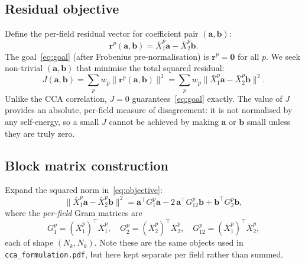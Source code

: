 \documentclass[a4paper,11pt]{article}
\newcommand{\va}{\bm{a}}
\newcommand{\vb}{\bm{b}}
\newcommand{\Xn}[2]{\bar{X}_{#1}^{#2}}
\newcommand{\Gb}[1]{G_{#1}}
\newcommand{\Nk}{N_k}
\theoremstyle{plain}
\begin{document}
\subsection{Residual objective}
\label{sec:residual}

Define the per-field residual vector for coefficient pair $(\va, \vb)$:
\begin{equation}
    \bm{r}^p(\va,\vb) = \Xn{1}{p}\va - \Xn{2}{p}\vb.
    \label{eq:residual}
\end{equation}
The goal~\eqref{eq:goal} (after Frobenius pre-normalisation) is $\bm{r}^p = \bm{0}$
for all $p$.
We seek non-trivial $(\va, \vb)$ that minimise the total squared residual:
\begin{equation}
    J(\va,\vb) = \sum_p w_p \lVert\bm{r}^p(\va,\vb)\rVert^2
               = \sum_p w_p \lVert\Xn{1}{p}\va - \Xn{2}{p}\vb\rVert^2.
    \label{eq:objective}
\end{equation}
Unlike the CCA correlation, $J = 0$ guarantees~\eqref{eq:goal} exactly.
The value of $J$ provides an absolute, per-field measure of disagreement:
it is not normalised by any self-energy, so a small $J$ cannot be achieved
by making $\va$ or $\vb$ small unless they are truly zero.

\subsection{Block matrix construction}
\label{sec:block}

Expand the squared norm in~\eqref{eq:objective}:
\begin{equation}
    \lVert\Xn{1}{p}\va - \Xn{2}{p}\vb\rVert^2
    = \va^\top \Gb{1}^p \va - 2\,\va^\top \Gb{12}^p \vb + \vb^\top \Gb{2}^p \vb,
\end{equation}
where the \emph{per-field} Gram matrices are
\begin{equation}
    \Gb{1}^p = (\Xn{1}{p})^\top\Xn{1}{p}, \quad
    \Gb{2}^p = (\Xn{2}{p})^\top\Xn{2}{p}, \quad
    \Gb{12}^p = (\Xn{1}{p})^\top\Xn{2}{p},
    \label{eq:pergram}
\end{equation}
each of shape $(\Nk,\Nk)$.
Note these are the same objects used in \texttt{cca\_formulation.pdf}, but here
kept separate per field rather than summed.
\end{document}
